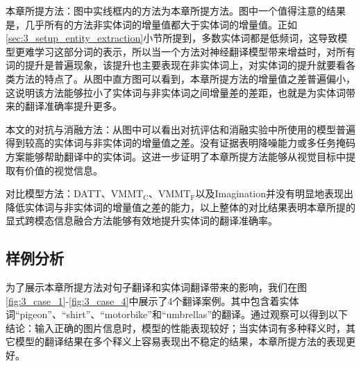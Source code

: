 {\sffamily 本章所提方法：}图中实线框内的方法为本章所提方法。图中一个值得注意的结果是，几乎所有的方法非实体词的增量值都大于实体词的增量值。正如\ref{sec:3_setup_entity_extraction}小节所提到，多数实体词都是低频词，这导致模型更难学习这部分词的表示，所以当一个方法对神经翻译模型带来增益时，对所有词的提升是普遍现象，该提升也主要表现在非实体词上，对实体词的提升就要看各类方法的特点了。从图中直方图可以看到，本章所提方法的增量值之差普遍偏小，这说明该方法能够拉小了实体词与非实体词之间增量差的差距，也就是为实体词带来的翻译准确率提升更多。

{\sffamily 本文的对抗与消融方法：}从图中可以看出对抗评估和消融实验中所使用的模型普遍得到较高的实体词与非实体词的增量值之差。没有证据表明降噪能力或多任务掩码方案能够帮助翻译中的实体词。这进一步证明了本章所提方法能够从视觉目标中提取有价值的视觉信息。

{\sffamily 对比模型方法：}DATT、$ \mathrm{VMMT_C} $、$ \mathrm{VMMT_F} $以及Imagination并没有明显地表现出降低实体词与非实体词的增量值之差的能力，以上整体的对比结果表明本章所提的显式跨模态信息融合方法能够有效地提升实体词的翻译准确率。

\subsection{样例分析}




为了展示本章所提方法对句子翻译和实体词翻译带来的影响，我们在图\ref{fig:3_case_1}-\ref{fig:3_case_4}中展示了4个翻译案例。其中包含着实体词“pigeon”、“shirt”、“motorbike”和“umbrellas”的翻译。通过观察可以得到以下结论：输入正确的图片信息时，模型的性能表现较好；当实体词有多种释义时，其它模型的翻译结果在多个释义上容易表现出不稳定的结果，本章所提方法的表现更好。